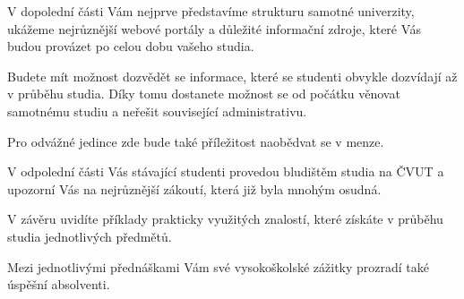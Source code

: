 \documentclass[12pt]{extarticle}[10.3.2013]
\begin{document}
V dopolední části Vám nejprve představíme strukturu samotné univerzity,
ukážeme nejrůznější webové portály a důležité informační zdroje,
které Vás budou provázet po celou dobu vašeho studia. 

Budete mít možnost dozvědět se informace, které se studenti obvykle
dozvídají až v průběhu studia. Díky tomu dostanete možnost se od
počátku věnovat samotnému studiu a neřešit související administrativu.

Pro odvážné jedince zde bude také příležitost naobědvat se v menze.

V odpolední části Vás stávající studenti provedou bludištěm studia na
ČVUT a upozorní Vás na nejrůznější zákoutí, která již byla mnohým osudná.

V závěru uvidíte příklady prakticky využitých znalostí, které získáte v
průběhu studia jednotlivých předmětů.

Mezi jednotlivými přednáškami Vám své vysokoškolské zážitky prozradí
také úspěšní absolventi.

\vspace{3em}
\end{document}
